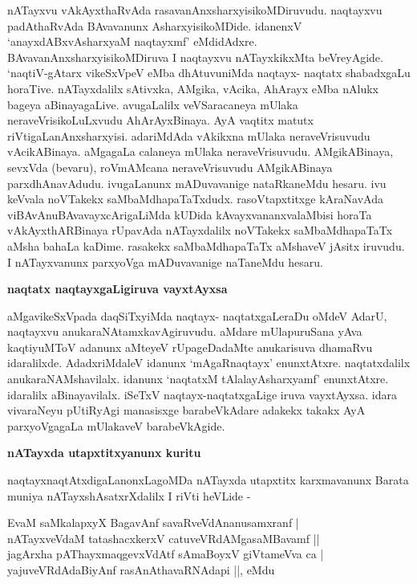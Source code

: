 nATayxvu vAkAyxthaRvAda rasavanAnxsharxyisikoMDiruvudu. naqtayxvu padAthaR\-vAda BAvavanunx Asharx\-yisikoMDide. idanenxV `anayxdABxvAsharxyaM naqtayxmf'\label{241} eMdidAdxre. BAvavanAnxsharxyisikoMDiruva I naq\-tayxvu nATayxkikxMta beVreyAgide. `naqtiV-gAtarx vikeSxVpeV eMba dhAtuvuniMda naqtayx- naqtatx shabadxgaLu hora\-Tive. nATayxdalilx sAtivxka, AMgika, vAcika, AhArayx eMba nAlukx bageya aBinayagaLive. avugaLalilx veVSaracaneya mUlaka neraveVrisikoLuLxvudu AhArAyxBinaya. AyA vaqtitx matutx riVtigaLanAnxsharx\-yisi. adariMdAda vAkikxna mUlaka neraveVrisuvudu vAcikABinaya. aMgagaLa calaneya mUlaka neraveVrisuvudu. AMgikABinaya, sevxVda (bevaru), roVmAMcana neraveVrisuvudu AMgikABinaya parxdhAnavAdudu. ivugaLanunx mADuvavanige nataRkaneMdu hesaru. ivu keVvala noVTakekx saMbaMdha\-paTaTxdudx. rasoVtapxtitxge kAraNavAda viBAvAnuBAvavayxcArigaLiMda kUDida kAvayxvananxvalaMbisi horaTa vAkAyxthARBinaya rUpavAda nATayxdalilx noVTakekx saMbaMdhapaTaTx aMsha bahaLa kaDime. rasakekx saMbaMdha\-paTaTx aMshaveV jAsitx iruvudu. I nATayxvanunx parxyoVga mADuvavanige naTaneMdu hesaru.

{\bigskip
\noindent
{\large\bf naqtatx naqtayxgaLigiruva vayxtAyxsa}}
\medskip

\noindent
aMgavikeSxVpada daqSiTxyiMda naqtayx- naqtatxgaLeraDu oMdeV AdarU, naqtayxvu anukaraNAtamxkavAgiru\-vudu. aMdare mUlapuruSana yAva kaqtiyuMToV adanunx aMteyeV rUpageDadaMte anukarisuva dhamaR\-vu idaralilxde. AdadxriMdaleV idanunx `mAgaRnaqtayx' enunxtAtxre. naqtatxdalilx anukaraNAMshavilalx. idanunx `naqtatxM tAlalayAsharxyamf' enunxtAtxre. idaralilx aBinayavilalx. iSeTxV naqtayx-naqtatxgaLige iruva vayxtAyxsa. idara vivaraNeyu pUtiRyAgi manasisxge barabeVkAdare adakekx takakx AyA parxyoVgagaLa mUlakaveV barabeVkAgide.

{\bigskip
\noindent
{\large\bf nATayxda utapxtitxyanunx kuritu}}\label{page242}
\medskip

\noindent
naqtayxnaqtAtxdigaLanonxLagoMDa nATayxda utapxtitx karxmavanunx Barata muniya nATayxshAsatxrXdalilx I riVti heVLide -

\begin{shloka}
EvaM saMkalapxyX BagavAnf savaRveVdAnanusamxranf |\\\label{242}
nATayxveVdaM tatashacxkerxV catuveVRdAMgasaMBavamf ||\\
jagArxha pAThayxmaqgevxVdAtf sAmaBoyxV giVtameVva ca |\\
yajuveVRdAdaBiyAnf rasAnAthavaRNAdapi ||, eMdu
\end{shloka}

